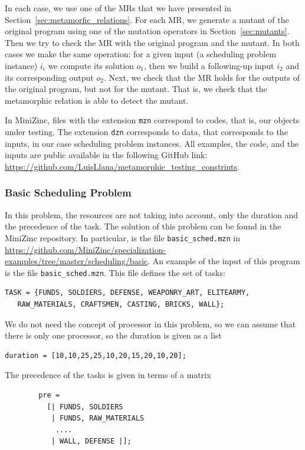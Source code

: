 In each case, we use one of the MRs that we have
presented in Section~\ref{sec:metamorfic_relations}.
For each
MR,  we generate a
mutant of the original program using one of the mutation operators in
Section~\ref{sec:mutants}.
Then we try to check the MR with the original program and
the mutant. In both cases we make the same operation: for a given
input (a scheduling problem instance) $i_{i}$ we compute its solution
$o_{1}$, then we build a following-up input $i_{2}$ and its
corresponding output $o_{2}$. 
Next, we check that the MR
holds for the outputs of the original program, but not for the
mutant. That is, we check that the metamorphic relation is able
to detect the mutant.




In MiniZinc, files with the extension \texttt{mzn} correspond to
codes, that is, our objects under testing. The extension \texttt{dzn}
corresponds to data, that corresponds to the inputs, in our case
scheduling problem instances.
All examples, the code, and the inputs are public available in the
following GitHub link:
\url{https://github.com/LuisLlana/metamorphic_testing_constrints}.

\subsubsection{Basic Scheduling Problem}
\label{subsubsec: Basic Scheduling Problem}

In this problem, the resources are not taking into account, only the
duration and the precedence of the task.
The solution of this problem can be found in the MiniZinc repository.
In particular, is the file \lstinline{basic_sched.mzn} in
\url{https://github.com/MiniZinc/specialization-examples/tree/master/scheduling/basic}.
An example of the input of this program is the file
\lstinline{basic_sched.mzn}. This file defines the set of tasks:
\begin{lstlisting}
TASK = {FUNDS, SOLDIERS, DEFENSE, WEAPONRY_ART, ELITEARMY,
   RAW_MATERIALS, CRAFTSMEN, CASTING, BRICKS, WALL};
\end{lstlisting}
We do not need the concept of processor in this problem, so we can
assume that there is only one processor, so
the duration is given as a list
\begin{lstlisting}
duration = [10,10,25,25,10,20,15,20,10,20];
\end{lstlisting}
The precedence of the tasks is given in terms of a matrix
\begin{lstlisting}
        pre =
          [| FUNDS, SOLDIERS
           | FUNDS, RAW_MATERIALS
            ....
           | WALL, DEFENSE |];
\end{lstlisting}

